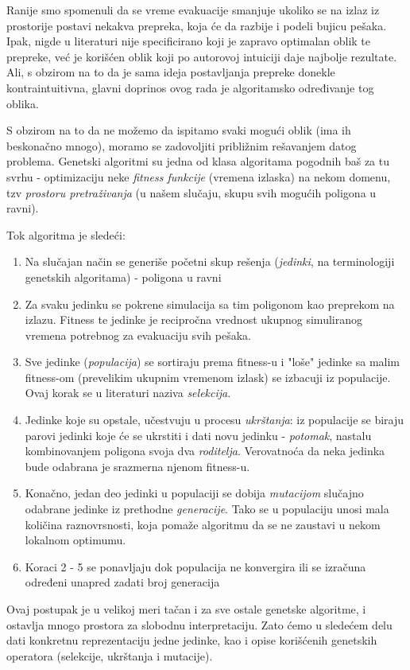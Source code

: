 \documentclass[12pt]{article}
\begin{document}
Ranije smo spomenuli da se vreme evakuacije smanjuje ukoliko se na izlaz iz prostorije postavi nekakva prepreka, koja će da razbije i podeli bujicu pešaka. Ipak, nigde u literaturi nije specificirano koji je zapravo optimalan oblik te prepreke, već je korišćen oblik koji po autorovoj intuiciji daje najbolje rezultate. Ali, s obzirom na to da je sama ideja postavljanja prepreke donekle kontraintuitivna, glavni doprinos ovog rada je algoritamsko određivanje tog oblika.

S obzirom na to da ne možemo da ispitamo svaki mogući oblik (ima ih beskonačno mnogo), moramo se zadovoljiti približnim rešavanjem datog problema. Genetski algoritmi su jedna od klasa algoritama pogodnih baš za tu svrhu - optimizaciju neke \emph{fitness funkcije} (vremena izlaska) na nekom domenu, tzv \emph{prostoru pretraživanja} (u našem slučaju, skupu svih mogućih poligona u ravni).

Tok algoritma je sledeći:
\begin{enumerate}
\item Na slučajan način se generiše početni skup rešenja (\emph{jedinki}, na terminologiji genetskih algoritama) - poligona u ravni
\item Za svaku jedinku se pokrene simulacija sa tim poligonom kao preprekom na izlazu. Fitness te jedinke je recipročna vrednost ukupnog simuliranog vremena potrebnog za evakuaciju svih pešaka.
\item Sve jedinke (\emph{populacija}) se sortiraju prema fitness-u i "loše" jedinke sa malim fitness-om (prevelikim ukupnim vremenom izlask) se izbacuji iz populacije. Ovaj korak se u literaturi naziva \emph{selekcija}.
\item Jedinke koje su opstale, učestvuju u procesu \emph{ukrštanja}: iz populacije se biraju parovi jedinki koje će se ukrstiti i dati novu jedinku - \emph{potomak}, nastalu kombinovanjem poligona svoja dva \emph{roditelja}. Verovatnoća da neka jedinka bude odabrana je srazmerna njenom fitness-u.
\item Konačno, jedan deo jedinki u populaciji se dobija \emph{mutacijom} slučajno odabrane jedinke iz prethodne \emph{generacije}. Tako se u populaciju unosi mala količina raznovrsnosti, koja pomaže algoritmu da se ne zaustavi u nekom lokalnom optimumu.
\item Koraci 2 - 5 se ponavljaju dok populacija ne konvergira ili se izračuna određeni unapred zadati broj generacija
\end{enumerate}

Ovaj postupak je u velikoj meri tačan i za sve ostale genetske algoritme, i ostavlja mnogo prostora za slobodnu interpretaciju. Zato ćemo u sledećem delu dati konkretnu reprezentaciju jedne jedinke, kao i opise korišćenih genetskih operatora (selekcije, ukrštanja i mutacije).
\end{document}
